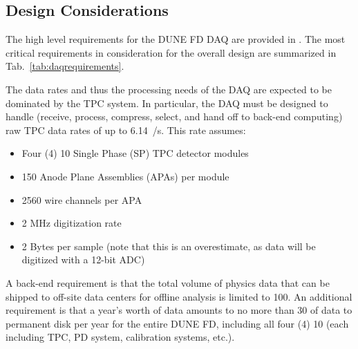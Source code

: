 
\subsection{Design Considerations}
\label{sec:fdsp-daq-des-consid}



The high level requirements for the DUNE FD DAQ are provided in
\cite{daq:reqs}.
The most critical requirements in consideration for the overall design
are summarized in Tab.~\ref{tab:daqrequirements}.

The data rates and thus the processing needs of the DAQ are expected
to be dominated by the TPC system.
In particular, the DAQ must be designed to handle (receive, process,
compress, select, and hand off to back-end computing) raw TPC data
rates of up to \SI{6.14}{\TB/\s}. 
This rate assumes:
\begin{itemize}
\item Four (4) \SI{10}{\kton} Single Phase (SP) TPC detector modules
\item 150 Anode Plane Assemblies (APAs) per module
\item 2560 wire channels per APA 
\item 2 MHz digitization rate
\item 2 Bytes per sample (note that this is an overestimate, as data will be digitized with a 12-bit ADC)
\end{itemize}

A back-end requirement is that the total volume of physics data that
can be shipped to off-site data centers for offline analysis is
limited to \SI{100}{\Gbps}.
An additional requirement is that a year’s worth of data amounts to no
more than \SI{30}{\PB} of data to permanent disk per year for the
entire DUNE FD, including all four (4) \SI{10}{\kton}
 (each including TPC, PD system, calibration
systems, etc.).

